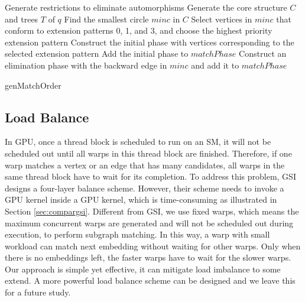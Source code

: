 \begin{algorithm}
	Generate restrictions to eliminate automorphisms\;
	Generate the core structure $C$ and trees $T$ of $q$\;
	Find the smallest circle $minc$ in $C$\;
	Select vertices in $minc$ that conform to extension patterns 0, 1, and 3, and choose the highest priority extension pattern\;
	Construct the initial phase with vertices corresponding to the selected extension pattern\;
	Add the initial phase to $matchPhase$\;
	Construct an elimination phase with the backward edge in $minc$ and add it to $matchPhase$\;
	\caption{genMatchOrder}
	\label{algo:genmatchorder}
\end{algorithm}

\subsection{Load Balance}
In GPU, once a thread block is scheduled to run on an SM, it will not be scheduled out until all warps in this thread block are finished. Therefore, if one warp matches a vertex or an edge that has many candidates, all warps in the same thread block have to wait for its completion. To address this problem, GSI designs a four-layer balance scheme. However, their scheme needs to invoke a GPU kernel inside a GPU kernel, which is time-consuming as illustrated in Section \ref{sec:compargsi}. Different from GSI, we use fixed warps, which means the maximum concurrent warps are generated and will not be scheduled out during execution, to perform subgraph matching. In this way, a warp with small workload can match next embedding without waiting for other warps. Only when there is no embeddings left, the faster warps have to wait for the slower warps. Our approach is simple yet effective, it can mitigate load imbalance to some extend. A more powerful load balance scheme can be designed and we leave this for a future study. 